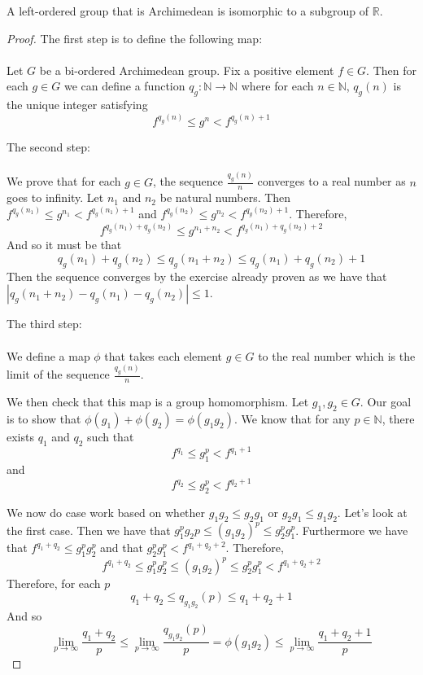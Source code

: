 \begin{theorem}
A left-ordered group that is Archimedean is isomorphic to a
subgroup of $\mathbb{R}$.
\end{theorem}
\begin{proof}
The first step is to define the following map:\\ \\
Let $G$ be a bi-ordered Archimedean group.
Fix a positive element $f \in G$. Then for each $g \in G$
we can define a function $q_g\colon \mathbb{N} \to \mathbb{N}$ where
for each $n \in \mathbb{N}$, $q_g(n)$ is the unique integer satisfying
\[
f^{q_g(n)} \le g^n < f^{q_g(n) + 1}
\]

The second step:\\ \\ 
We prove that for each $g \in G$,
the sequence $\frac{q_g(n)}{n}$ converges to a real number as $n$
goes to infinity.
Let $n_1$ and $n_2$ be natural numbers. Then
$f^{q_g(n_1)} \le g^{n_1} < f^{q_g(n_1) + 1}$ and
$f^{q_g(n_2)} \le g^{n_2} < f^{q_g(n_2) + 1}$.
Therefore,
\[
f^{q_g(n_1)+q_g(n_2)} \le g^{n_1+n_2} < f^{q_g(n_1) + q_g(n_2) + 2}
\]
And so it must be that 
\[
q_g(n_1) + q_g(n_2) \le q_g(n_1 + n_2) \le q_g(n_1) + q_g(n_2) + 1
\]
Then the sequence converges by the exercise already proven as we have that
$|q_g(n_1+n_2) - q_g(n_1) - q_g(n_2)| \le 1$.

The third step:\\ \\
We define a map $\phi$ that takes each element $g \in G$ to the real number which is the limit
of the sequence $\frac{q_g(n)}{n}$.

We then check that this map is a group homomorphism.
Let $g_1,g_2 \in G$. Our goal is to show that $\phi(g_1) + \phi(g_2) = \phi(g_1g_2)$.
We know that for any $p \in \mathbb{N}$, there exists $q_1$ and $q_2$ such that
\[
f^{q_1} \le g_1^p < f^{q_1 + 1}
\]
and
\[
f^{q_2} \le g_2^p < f^{q_2 + 1}
\]

We now do case work based on whether $g_1g_2 \le g_2g_1$ or
$g_2g_1 \le g_1g_2$. Let's look at the first case.
Then we have that $g_1^pg_2p \le (g_1g_2)^p \le g_2^pg_1^p$.
Furthermore we have that $f^{q_1+q_2} \le g_1^pg_2^p$ and that
$g_2^pg_1^p < f^{q_1+q_2+2}$. Therefore,
\[
f^{q_1+q_2} \le g_1^pg_2^p \le (g_1g_2)^p \le g_2^pg_1^p < f^{q_1+q_2+2}
\]
Therefore, for each $p$
\[
q_1+q_2 \le q_{g_1g_2}(p) \le q_1+q_2 + 1
\]
And so
\[
\lim_{p \to\infty} \frac{q_1+q_2}{p} \le \lim_{p\to\infty} \frac{q_{g_1g_2}(p)}{p}=\phi(g_1g_2) \le \lim_{p\to\infty} \frac{q_1+q_2 + 1}{p}
\]


\end{proof}

